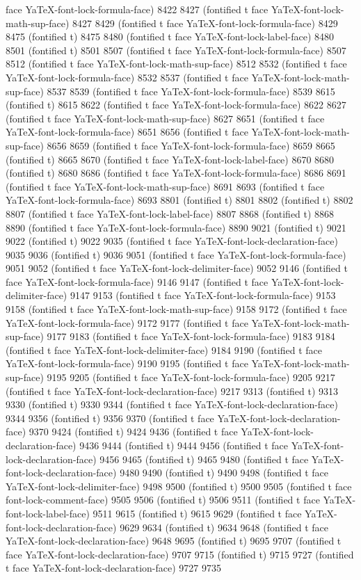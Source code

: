 face YaTeX-font-lock-formula-face) 8422 8427 (fontified t face YaTeX-font-lock-math-sup-face) 8427 8429 (fontified t face YaTeX-font-lock-formula-face) 8429 8475 (fontified t) 8475 8480 (fontified t face YaTeX-font-lock-label-face) 8480 8501 (fontified t) 8501 8507 (fontified t face YaTeX-font-lock-formula-face) 8507 8512 (fontified t face YaTeX-font-lock-math-sup-face) 8512 8532 (fontified t face YaTeX-font-lock-formula-face) 8532 8537 (fontified t face YaTeX-font-lock-math-sup-face) 8537 8539 (fontified t face YaTeX-font-lock-formula-face) 8539 8615 (fontified t) 8615 8622 (fontified t face YaTeX-font-lock-formula-face) 8622 8627 (fontified t face YaTeX-font-lock-math-sup-face) 8627 8651 (fontified t face YaTeX-font-lock-formula-face) 8651 8656 (fontified t face YaTeX-font-lock-math-sup-face) 8656 8659 (fontified t face YaTeX-font-lock-formula-face) 8659 8665 (fontified t) 8665 8670 (fontified t face YaTeX-font-lock-label-face) 8670 8680 (fontified t) 8680 8686 (fontified t face YaTeX-font-lock-formula-face) 8686 8691 (fontified t face YaTeX-font-lock-math-sup-face) 8691 8693 (fontified t face YaTeX-font-lock-formula-face) 8693 8801 (fontified t) 8801 8802 (fontified t) 8802 8807 (fontified t face YaTeX-font-lock-label-face) 8807 8868 (fontified t) 8868 8890 (fontified t face YaTeX-font-lock-formula-face) 8890 9021 (fontified t) 9021 9022 (fontified t) 9022 9035 (fontified t face YaTeX-font-lock-declaration-face) 9035 9036 (fontified t) 9036 9051 (fontified t face YaTeX-font-lock-formula-face) 9051 9052 (fontified t face YaTeX-font-lock-delimiter-face) 9052 9146 (fontified t face YaTeX-font-lock-formula-face) 9146 9147 (fontified t face YaTeX-font-lock-delimiter-face) 9147 9153 (fontified t face YaTeX-font-lock-formula-face) 9153 9158 (fontified t face YaTeX-font-lock-math-sup-face) 9158 9172 (fontified t face YaTeX-font-lock-formula-face) 9172 9177 (fontified t face YaTeX-font-lock-math-sup-face) 9177 9183 (fontified t face YaTeX-font-lock-formula-face) 9183 9184 (fontified t face YaTeX-font-lock-delimiter-face) 9184 9190 (fontified t face YaTeX-font-lock-formula-face) 9190 9195 (fontified t face YaTeX-font-lock-math-sup-face) 9195 9205 (fontified t face YaTeX-font-lock-formula-face) 9205 9217 (fontified t face YaTeX-font-lock-declaration-face) 9217 9313 (fontified t) 9313 9330 (fontified t) 9330 9344 (fontified t face YaTeX-font-lock-declaration-face) 9344 9356 (fontified t) 9356 9370 (fontified t face YaTeX-font-lock-declaration-face) 9370 9424 (fontified t) 9424 9436 (fontified t face YaTeX-font-lock-declaration-face) 9436 9444 (fontified t) 9444 9456 (fontified t face YaTeX-font-lock-declaration-face) 9456 9465 (fontified t) 9465 9480 (fontified t face YaTeX-font-lock-declaration-face) 9480 9490 (fontified t) 9490 9498 (fontified t face YaTeX-font-lock-delimiter-face) 9498 9500 (fontified t) 9500 9505 (fontified t face font-lock-comment-face) 9505 9506 (fontified t) 9506 9511 (fontified t face YaTeX-font-lock-label-face) 9511 9615 (fontified t) 9615 9629 (fontified t face YaTeX-font-lock-declaration-face) 9629 9634 (fontified t) 9634 9648 (fontified t face YaTeX-font-lock-declaration-face) 9648 9695 (fontified t) 9695 9707 (fontified t face YaTeX-font-lock-declaration-face) 9707 9715 (fontified t) 9715 9727 (fontified t face YaTeX-font-lock-declaration-face) 9727 9735 